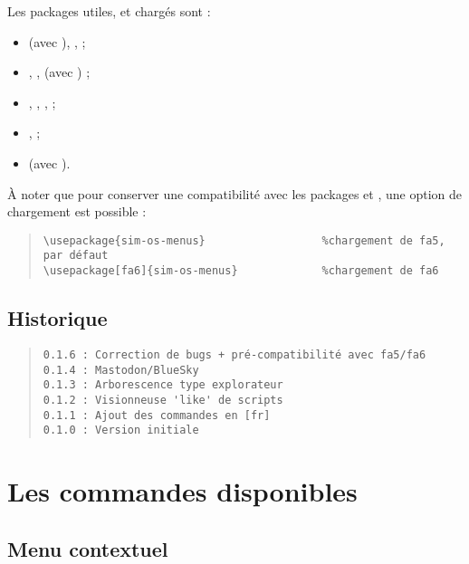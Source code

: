 \documentclass[11pt,a4paper]{ltxdoc}
\begin{document}
Les packages utiles, et chargés sont :

\begin{itemize}
	\item {} (avec ), ,  ;
	\item {}, ,  (avec ) ;
	\item {}, , ,  ;
	\item {},  ;
	\item {} (avec ).
\end{itemize}

À noter que pour conserver une compatibilité avec les packages  et , une option de chargement est possible :

\begin{quote}
\begin{verbatim}
\usepackage{sim-os-menus}                  %chargement de fa5, par défaut
\usepackage[fa6]{sim-os-menus}             %chargement de fa6
\end{verbatim}
\end{quote}

\vfill

\subsection{Historique}

\begin{quote}
\begin{verbatim}
0.1.6 : Correction de bugs + pré-compatibilité avec fa5/fa6
0.1.4 : Mastodon/BlueSky
0.1.3 : Arborescence type explorateur
0.1.2 : Visionneuse 'like' de scripts
0.1.1 : Ajout des commandes en [fr]
0.1.0 : Version initiale
\end{verbatim}
\end{quote}

\pagebreak

\section{Les commandes disponibles}

\subsection{Menu contextuel}
\end{document}
